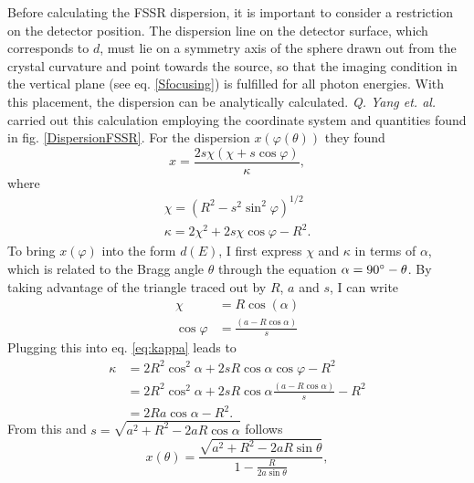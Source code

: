 Before calculating the FSSR dispersion, it is important to consider a 
restriction on the detector position. The dispersion line on the detector 
surface, which corresponds to 
$d$, must lie on a symmetry axis of the sphere drawn out from the crystal 
curvature and point towards the source, so that the imaging condition in the 
vertical plane (see eq. \ref{Sfocusing}) is fulfilled for all photon energies. 
With this 
placement, the dispersion can be analytically calculated. \textit{Q. Yang et. 
al.} 
\citep{yang2011focusing} carried out this calculation employing the coordinate 
system and 
quantities found in fig. \ref{DispersionFSSR}. For the dispersion 
$x(\varphi(\theta))$ they found
\begin{equation}
	x = \frac{2s\chi(\chi+s\cos\varphi)}{\kappa},
\end{equation}
where
\begin{equation}
\begin{gathered}
	\chi = (R^2-s^2\sin^2\varphi)^{1/2} \\
	\kappa = 2\chi^2 + 2s\chi \cos\varphi - R^2. \label{eq:kappa}
\end{gathered}
\end{equation}
To bring $x(\varphi)$ into the form $d(E)$, I first express $\chi$ and 
$\kappa$ in terms of $\alpha$, which is related to the Bragg angle $\theta$ 
through the equation $\alpha = 90\degree - \theta$. By taking advantage of the 
triangle traced out by $R$, $a$ and $s$, I can write
\begin{equation}
	\begin{aligned}
		\chi &= R\cos(\alpha)
		\\ \cos\varphi &= \frac{(a - R\cos\alpha)}{s}
	\end{aligned}
\end{equation}
Plugging this into eq. \ref{eq:kappa} leads to 
\begin{equation}
	\begin{aligned}
		\kappa &= 2R^2\cos^2\alpha + 2sR\cos\alpha \cos\varphi - R^2
		\\& =  2R^2\cos^2\alpha + 2sR\cos\alpha \frac{(a-R\cos\alpha)}{s} - R^2
		\\& =  2Ra\cos\alpha - R^2.
	\end{aligned}
\end{equation}
From this and $s = \sqrt{a^2+R^2-2aR\cos\alpha}$ follows 
\begin{equation}
	x(\theta) = \frac{\sqrt{a^2+R^2-2aR\sin\theta}}{1-\frac{R}{2a\sin\theta}},
\end{equation}

